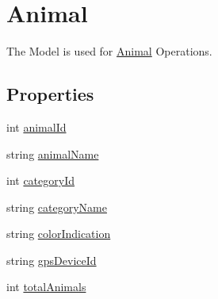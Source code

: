 \hypertarget{classWildlifeTrackingApp_1_1Models_1_1Animal}{}\section{Animal}
\label{classWildlifeTrackingApp_1_1Models_1_1Animal}


The Model is used for \hyperlink{classWildlifeTrackingApp_1_1Models_1_1Animal}{Animal} Operations.  


\subsection*{Properties}
\begin{DoxyCompactItemize}
\item 
int \hyperlink{classWildlifeTrackingApp_1_1Models_1_1Animal_a99787b9867ae390df467a99040589a55}{animal\+Id}
\item 
string \hyperlink{classWildlifeTrackingApp_1_1Models_1_1Animal_afd38ba6641283469fc9e94212467f9a2}{animal\+Name}
\item 
int \hyperlink{classWildlifeTrackingApp_1_1Models_1_1Animal_a423f91c56dc35040d661cfbe357f7c78}{category\+Id}
\item 
string \hyperlink{classWildlifeTrackingApp_1_1Models_1_1Animal_a1eca787c85e1bc45b49bbd281d4106fd}{category\+Name}
\item 
string \hyperlink{classWildlifeTrackingApp_1_1Models_1_1Animal_a0ecdefcc99a4b41b1ef3a04167756366}{color\+Indication}
\item 
string \hyperlink{classWildlifeTrackingApp_1_1Models_1_1Animal_a073b88a9702ca0513fa534f58a048070}{gps\+Device\+Id}
\item 
int \hyperlink{classWildlifeTrackingApp_1_1Models_1_1Animal_af2a3c76f434001a3f47c287cc16f04ff}{total\+Animals}
\end{DoxyCompactItemize}


